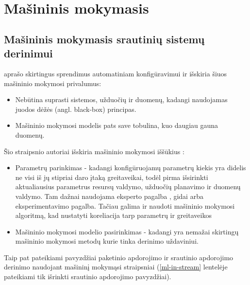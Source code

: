 \documentclass{VUMIFPSbakalaurinis}
\begin{document}
\section{Mašininis mokymasis}

\subsection{Mašininis mokymasis srautinių sistemų derinimui}

\cite{herodotou2020survey} aprašo skirtingus sprendimus automatiniam konfigūravimui ir išskiria šiuos mašininio mokymosi privalumus:
\begin{itemize}
    \item Nebūtina suprasti sistemos, užduočių ir duomenų, kadangi naudojamas juodos dėžės (angl. black-box) principas.
    \item Mašininio mokymosi modelis pats save tobulina, kuo daugiau gauna duomenų. 
\end{itemize}
Šio straipsnio autoriai išskiria mašininio mokymosi iššūkius : 
\begin{itemize}
    \item Parametrų parinkimas - kadangi konfigūruojamų parametrų kiekis yra didelis \cite{Bilal2017Towards, petridis2016spark} ne visi iš jų stipriai daro įtaką greitaveikai, todėl pirma išsirinkti aktualiausius parametrus resursų valdymo, užduočių planavimo ir duomenų valdymo. Tam dažnai naudojama eksperto pagalba \cite{wang2016novel}, gidai arba eksperimentavimo pagalba. Tačiau galima ir naudoti mašininio mokymosi algoritmą, kad nustatyti koreliacija tarp parametrų ir greitaveikos \cite{vaquero2018autotuning, yang2012statistics}
    \item Mašininio mokymosi modelio pasirinkimas - kadangi yra nemažai skirtingų mašininio mokymosi metodų kurie tinka derinimo uždaviniui.
\end{itemize} 
Taip pat pateikiami pavyzdžiai paketinio apdorojimo ir srautinio apdorojimo derinimo naudojant mašininį mokymąsi straipsniai (\ref{ml-in-stream} lentelėje pateikiami tik išrinkti srautinio apdorojimo pavyzdžiai).
\end{document}
